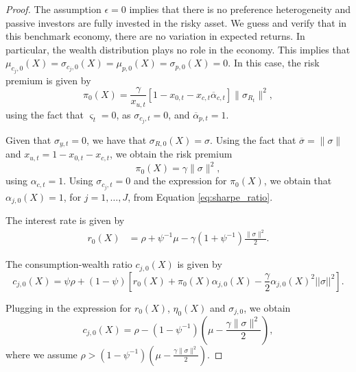 \begin{proof} The assumption $\epsilon = 0$ implies that there is no preference heterogeneity and passive investors are fully invested in the risky asset. We guess and verify that in this benchmark economy, there are no variation in expected returns. In particular, the wealth distribution plays no role in the economy. This implies that $\mu_{c_j,0}(X) = \sigma_{c_j,0}(X) = \mu_{p,0}(X) = \sigma_{p,0}(X) = 0$. In this case, the risk premium is given by
\begin{equation}
    \pi_{0}(X) =  \frac{\gamma}{x_{u,t}} \left[ 1-x_{0,t}-x_{c,t} \overline{\alpha}_{c,t}\right] \|\sigma_{R_t}\|^ 2 ,
\end{equation}
using the fact that $\varsigma_t = 0$, as $\sigma_{c_j,t} = 0$, and $\overline{\alpha}_{p,t} =1$. 

Given that $\sigma_{y,t} = 0$, we have that $\sigma_{R,0}(X) = \sigma$. 
Using the fact that $\overline{\sigma}=\|\sigma\|$ and $x_{u,t}=1-x_{0,t}-x_{c,t}$, we obtain the risk premium $$\pi_{0}(X) = \gamma \|\sigma\|^2,$$  using $\alpha_{c,t} = 1$.
Using $\sigma_{c_j,t} = 0$ and the expression for $\pi_0(X)$, we obtain that $\alpha_{j,0}(X) = 1$, for $j=1,\ldots, J$, from Equation \eqref{eq:sharpe_ratio}. 

The interest rate is given by
\begin{align}
     r_0(X)   &  =  \rho +\psi^{-1} \mu-  \gamma(1+\psi^{-1})\frac{\|\sigma\|^2}{2} .
\end{align}

The consumption-wealth ratio $c_{j,0}(X)$ is given by
\begin{equation}
    c_{j,0}(X) = \psi \rho + (1-\psi) \left[ r_0(X) + \pi_0(X) \alpha_{j,0}(X) - \frac{\gamma}{2} \alpha_{j,0}(X)^2||\sigma||^2 \right].
\end{equation}

Plugging in the expression for $r_0(X)$, $\eta_0(X)$ and $\sigma_{j,0}$, we obtain
\begin{equation}
    c_{j,0}(X) = \rho  - \left(1-\psi^{-1}\right)  \left( \mu - \frac{\gamma\|\sigma\|^2}{2} \right),
\end{equation}
where we assume $\rho  > \left(1-\psi^{-1}\right)  \left( \mu - \frac{\gamma\|\sigma\|^2}{2} \right)$.


\end{proof}
